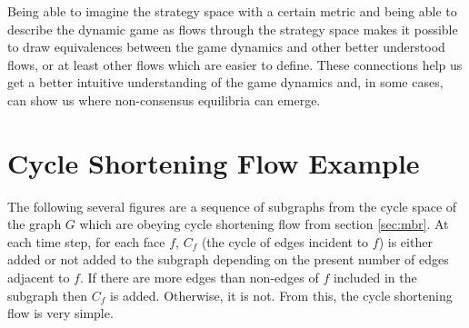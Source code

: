 \documentclass{article}
\begin{document}
Being able to imagine the strategy space with a certain metric and being able to describe the dynamic game as flows through the strategy space makes it possible to draw equivalences between the game dynamics and other better understood flows, or at least other flows which are easier to define. These connections help us get a better intuitive understanding of the game dynamics and, in some cases, can show us where non-consensus equilibria can emerge. 

\appendix
\section{Cycle Shortening Flow Example}\label{app:CSFexample}
The following several figures are a sequence of subgraphs from the cycle space of the graph $G$ which are obeying cycle shortening flow from section \ref{sec:mbr}. At each time step, for each face $f$, $C_f$ (the cycle of edges incident to $f$) is either added or not added to the subgraph depending on the present number of edges adjacent to $f$. If there are more edges than non-edges of $f$ included in the subgraph then $C_f$ is added. Otherwise, it is not. From this, the cycle shortening flow is very simple. 
\end{document}
